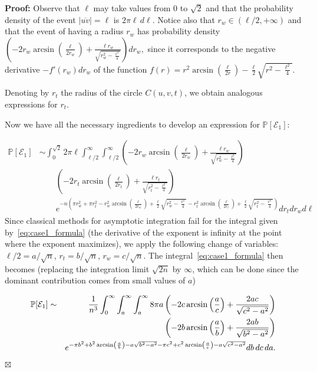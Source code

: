 \documentclass {journal}
\newenvironment {proof}{\textbf {Proof:}}{\hfill \ensuremath {\boxtimes}}
\newcommand{\bP}{{\mathbb P}}
\begin{document}
\begin{proof}
Observe that $\ell$ may take values from $0$ to $\sqrt{2}$ and
that the probability density of the event $|\overline{uv}|=\ell$
is $2\pi \ell\,d\ell$. Notice also that
$r_w \in (\ell/2,+\infty)$ and that the event of having a radius $r_w$
has probability density
$\left(-2r_w\arcsin\left(\frac{\ell}{2r_w}\right)+\frac{\ell r_w}{\sqrt{r_w^2-\frac{\ell^2}{4}}}\right)dr_w,$
since it corresponds to the negative derivative $-f'(r_w) dr_w$ of the function
$f(r)=r^2\arcsin\left(\frac{\ell}{2r}\right)-\frac{\ell}{2}\sqrt{r^2-\frac{\ell^2}{4}}.$

Denoting by $r_t$ the radius of the circle $C(u,v,t)$, we obtain analogous expressions for $r_t$.

Now we have all the necessary ingredients to develop an expression
for $\bP[\mathcal{E}_1]:$

\begin{equation}\label{eq:case1_formula}
\begin{split}
\bP[\mathcal{E}_1] & \sim \int_0^{\sqrt{2}} 2\pi \ell
\int_{\ell/2}^{\infty} \int_{\ell/2}^{\infty}
\left(-2r_w\arcsin\left(\frac{\ell}{2r_w}\right)+\frac{\ell
r_w}{\sqrt{r_w^2-\frac{\ell^2}{4}}}\right) \\ & \quad \quad
\left(-2r_t\arcsin\left(\frac{\ell}{2r_t}\right)+\frac{\ell r_t}{\sqrt{r_t^2-\frac{\ell^2}{4}}}\right) \\
& \quad \quad e^{-n(\pi r_w^2+\pi r_t^2
-r_w^2\arcsin(\frac{\ell}{2r_w})+\frac{\ell}{2}\sqrt{r_w^2-\frac{\ell^2}{4}}
-r_t^2\arcsin(\frac{\ell}{2r_t})+\frac{\ell}{2}\sqrt{r_t^2-\frac{\ell^2}{4}})}dr_tdr_wd\ell
\end{split}
\end{equation}
Since classical methods for asymptotic integration fail for the
integral given by~\eqref{eq:case1_formula} (the derivative of the
exponent is infinity at the point where the exponent maximizes),
we apply the following change of variables:  $\ell/2= a/\sqrt n$,
$r_t=b/\sqrt n$, $r_w = c/\sqrt n$. The
integral~\eqref{eq:case1_formula} then becomes (replacing the
integration limit $\sqrt{2n}$ by $\infty$, which can be done since
the dominant contribution comes from small values of $a$)

\begin{eqnarray*}\label{eq:case1_2}
 \bP[\mathcal{E}_1]&\sim&\frac{1}{n^3}
\int_0^{\infty} \int_{a}^{\infty} \int_{a}^{\infty} 8 \pi a
\left(-2c \arcsin\left(\frac{a}{c}\right)+\frac{2 ac}{\sqrt{c^2-a^2}} \right) \notag\\
&& \left(-2b \arcsin\left(\frac{a}{b}\right)+\frac{2 ab}{\sqrt{b^2-a^2}} \right)  \notag\\
&& e^{-\pi b^2 + b^2\arcsin\left(\frac{a}{b}\right) -a
\sqrt{b^2-a^2}-\pi c^2+c^2 \arcsin\left(\frac{a}{c}\right)-a
\sqrt{c^2-a^2} } db\,dc\,da.
\end{eqnarray*}


\end{proof}
\end{document}
